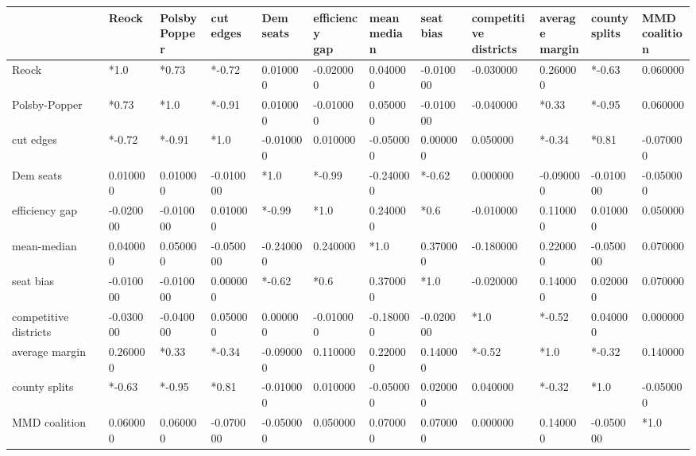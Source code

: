 \begin{tabular}{llllllllllll}
\toprule
 & Reock & \makecell{Polsby \\ Popper} & \makecell{cut \\ edges} & \makecell{Dem \\ seats} & \makecell{efficiency \\ gap} & \makecell{mean \\ median} & \makecell{seat \\ bias} & \makecell{competitive \\ districts} & \makecell{average \\ margin} & \makecell{county \\ splits} & \makecell{MMD \\ coalition} \\
\midrule
Reock & *1.0 & *0.73 & *-0.72 & 0.010000 & -0.020000 & 0.040000 & -0.010000 & -0.030000 & 0.260000 & *-0.63 & 0.060000 \\
Polsby-Popper & *0.73 & *1.0 & *-0.91 & 0.010000 & -0.010000 & 0.050000 & -0.010000 & -0.040000 & *0.33 & *-0.95 & 0.060000 \\
cut edges & *-0.72 & *-0.91 & *1.0 & -0.010000 & 0.010000 & -0.050000 & 0.000000 & 0.050000 & *-0.34 & *0.81 & -0.070000 \\
Dem seats & 0.010000 & 0.010000 & -0.010000 & *1.0 & *-0.99 & -0.240000 & *-0.62 & 0.000000 & -0.090000 & -0.010000 & -0.050000 \\
efficiency gap & -0.020000 & -0.010000 & 0.010000 & *-0.99 & *1.0 & 0.240000 & *0.6 & -0.010000 & 0.110000 & 0.010000 & 0.050000 \\
mean-median & 0.040000 & 0.050000 & -0.050000 & -0.240000 & 0.240000 & *1.0 & 0.370000 & -0.180000 & 0.220000 & -0.050000 & 0.070000 \\
seat bias & -0.010000 & -0.010000 & 0.000000 & *-0.62 & *0.6 & 0.370000 & *1.0 & -0.020000 & 0.140000 & 0.020000 & 0.070000 \\
competitive districts & -0.030000 & -0.040000 & 0.050000 & 0.000000 & -0.010000 & -0.180000 & -0.020000 & *1.0 & *-0.52 & 0.040000 & 0.000000 \\
average margin & 0.260000 & *0.33 & *-0.34 & -0.090000 & 0.110000 & 0.220000 & 0.140000 & *-0.52 & *1.0 & *-0.32 & 0.140000 \\
county splits & *-0.63 & *-0.95 & *0.81 & -0.010000 & 0.010000 & -0.050000 & 0.020000 & 0.040000 & *-0.32 & *1.0 & -0.050000 \\
MMD coalition & 0.060000 & 0.060000 & -0.070000 & -0.050000 & 0.050000 & 0.070000 & 0.070000 & 0.000000 & 0.140000 & -0.050000 & *1.0 \\
\bottomrule
\end{tabular}
